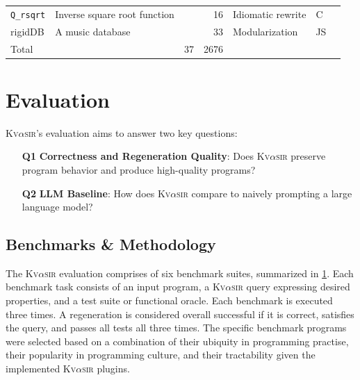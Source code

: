\documentclass[nonacm,sigplan,review]{acmart}
\newcommand{\sys}{{\scshape Kv{$\alpha$}sir}\xspace}
\newcommand{\ttt}[1]{\texttt{#1}\xspace}
\begin{document}
\begin{table}[t]
\begin{tabular*}{\textwidth}{llrrlll}
\hspace{.5em} \ttt{Q\_rsqrt}       & Inverse square root function             &    & 16  & Idiomatic rewrite      & C & \cite{fast_inv_sqrt}  \\
\hspace{.5em} \textsf{rigidDB}     & A music database &    & 33  & Modularization         & JS & \cite{codewithsadeemusicplayer} \\
\midrule
Total                              &                                          & 37 & 2676&                        & & \\
\bottomrule
\end{tabular*}
\label{tab:benchmarks}
\end{table}


\section{Evaluation}
\label{sec:evaluation}

\sys's evaluation aims to answer two key questions: 

\begin{itemize}
  \item[\textbf{Q1}] \textbf{Correctness and Regeneration Quality}: Does \sys preserve program behavior and produce high-quality programs?
  \item[\textbf{Q2}] \textbf{LLM Baseline}: How does \sys compare to naively prompting a large language model?
\end{itemize}



\subsection{Benchmarks \& Methodology}

The \sys evaluation comprises of six benchmark suites, summarized in \cref{tab:benchmarks}.
Each benchmark task consists of an input program, a \sys query expressing desired
properties, and a test suite or functional oracle.
Each benchmark is executed three times. A regeneration is considered overall successful 
if it is correct, satisfies the query, and passes all tests all three times.
The specific benchmark programs were selected based on a combination of their ubiquity in programming practise, their
popularity in programming culture, and their tractability given the implemented \sys plugins.
\end{document}
